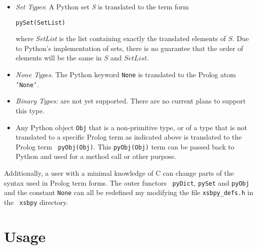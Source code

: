 \begin{itemize}
         {\tt pyDict(DictList)}

         where {\tt DictList} is a list of tuples in term form: 

         {\tt ''(Key,Value)}

         {\tt Key} and {\tt Value} are the translations of any Python
         data structures that are both allowable as a dictionary key
         or value, and supported by {\tt xsbpy}.  For instance, {\tt
           Value} can be (the term form of) a list, a set, a tuple or
         another dictionary.

       \item {\em Set Types}: A Python set {\em S} is translated to
         the term form

         {\tt pySet(SetList)}

         where {\em SetList} is the list containing exactly the
         translated elements of $S$.  Due to Python's implementation
         of sets, there is no guarantee that the order of elements
         will be the same in $S$ and $SetList$.
       \item {\em None Types.} The Python keyword {\tt None} is
         translated to the Prolog atom {\tt 'None'}. 
       \item {\em Binary Types:} are not yet supported.  There are no
         current plans to support this type.
     \item Any Python object {\tt Obj} that is a non-primitive type,
       or of a type that is not translated to a specific Prolog term
       as indicated above is translated to the Prolog term {\tt
         pyObj(Obj)}.  This {\tt pyObj(Obj)} term can be passed back to
       Python and used for a method call or other purpose.
\end{itemize}

Additionally, a user with a minimal knowledge of C can change parts of
the syntax used in Prolog term forms.  The outer functors {\tt
  pyDict}, {\tt pySet} and {\tt pyObj} and the constant {\tt None} can
all be redefined my modifying the file {\tt xsbpy\_defs.h} in the {\tt
  xsbpy} directory.

\section{Usage}

